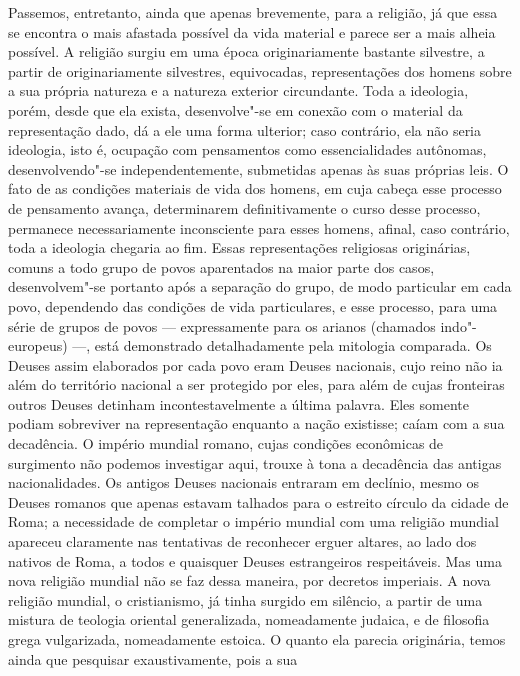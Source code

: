 Passemos, entretanto, ainda que apenas brevemente, para a religião, já
que essa se encontra o mais afastada possível da vida material e parece
ser a mais alheia possível. A religião surgiu em uma época
originariamente bastante silvestre, a partir 
de originariamente silvestres, equivocadas, representações dos homens
sobre a sua própria natureza e a natureza exterior circundante. Toda a
ideologia, porém, desde que ela exista, desenvolve"-se em conexão com o
material da representação dado, dá a ele uma forma ulterior; caso
contrário, ela não seria ideologia, isto é, ocupação com pensamentos
como essencialidades autônomas, desenvolvendo"-se independentemente,
submetidas apenas às suas próprias leis. O fato de as condições
materiais de vida dos homens, em cuja cabeça esse processo de pensamento
avança, determinarem definitivamente o curso desse processo, permanece
necessariamente inconsciente para esses homens, afinal, caso contrário,
toda a ideologia chegaria ao fim. Essas representações religiosas originárias, comuns a todo grupo de povos aparentados na maior parte dos casos, desenvolvem"-se portanto após a separação do grupo, de modo
particular em cada povo, dependendo das condições de vida particulares,
e esse processo, para uma série de grupos de povos --- expressamente para
os arianos (chamados indo"-europeus) ---, está demonstrado detalhadamente
pela mitologia comparada. Os Deuses assim elaborados por cada povo eram
Deuses nacionais, cujo reino não ia além do território nacional a ser
protegido por eles, para além de cujas fronteiras outros Deuses detinham
incontestavelmente a última palavra. Eles somente podiam sobreviver na
representação enquanto a nação existisse; caíam com a sua decadência. O
império mundial romano, cujas condições econômicas de surgimento não
podemos investigar aqui, trouxe à tona a decadência das antigas
nacionalidades. Os antigos Deuses nacionais entraram em declínio, mesmo
os Deuses romanos que apenas estavam talhados para o estreito círculo da
cidade de Roma; a necessidade de completar o império mundial com uma
religião mundial apareceu claramente nas tentativas de reconhecer
erguer altares, ao lado dos nativos de Roma, a todos e quaisquer Deuses
estrangeiros respeitáveis. Mas uma nova religião mundial não se faz
dessa maneira, por decretos imperiais. A nova religião mundial, o
cristianismo, já tinha surgido em silêncio, a partir de uma mistura de
teologia oriental generalizada, nomeadamente judaica, e de filosofia
grega vulgarizada, nomeadamente estoica. O quanto ela parecia
originária, temos ainda que pesquisar exaustivamente, pois a sua
